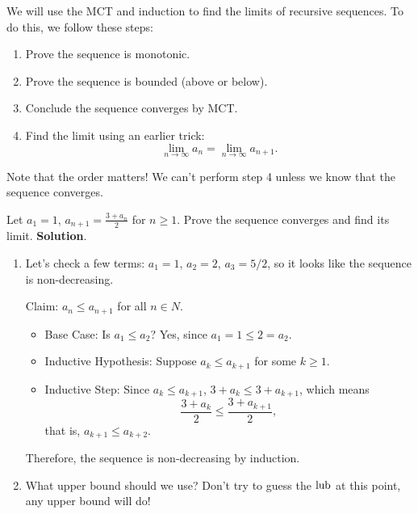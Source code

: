 We will use the MCT and induction to find the limits of recursive sequences.
To do this, we follow these steps:
\begin{enumerate}[(1)]
    \item Prove the sequence is monotonic.
    \item Prove the sequence is bounded (above or below).
    \item Conclude the sequence converges by MCT\@.
    \item Find the limit using an earlier trick:
          \[ \lim\limits_{{n} \to {\infty}}a_n=\lim\limits_{{n} \to {\infty}}a_{n+1}. \]
\end{enumerate}
Note that the order matters! We can't perform step 4 unless we know
that the sequence converges.
\begin{Example}{}{}
    Let $ \displaystyle  a_1=1 $, $ a_{n+1}=\frac{3+a_n}{2} $ for $ n\ge 1 $. Prove
    the sequence converges and find its limit.
    \tcblower{}
    \textbf{Solution}.
    \begin{enumerate}[(1)]
        \item Let's check a few terms: $ a_1=1 $, $ a_2=2 $, $ a_3=5/2 $,
              so it looks like the sequence is non-decreasing.

              Claim: $ a_n\le a_{n+1} $ for all $ n\in N $.
              \begin{itemize}
                  \item Base Case: Is $ a_1\le a_2 $? Yes, since $ a_1=1\le 2=a_2 $.
                  \item Inductive Hypothesis: Suppose $ a_k\le a_{k+1} $ for
                        some $ k\ge 1 $.
                  \item Inductive Step: Since $ a_k\le a_{k+1} $, $ 3+a_{k}\le 3+a_{k+1} $,
                        which means
                        \[ \frac{3+a_k}{2}\le \frac{3+a_{k+1}}{2}, \]
                        that is, $ a_{k+1}\le a_{k+2} $.
              \end{itemize}
              Therefore, the sequence is non-decreasing by induction.
        \item What upper bound should we use? Don't try to guess the $ \mathrm{lub} $
              at this point, any upper bound will do!


\end{enumerate}
\end{Example}
